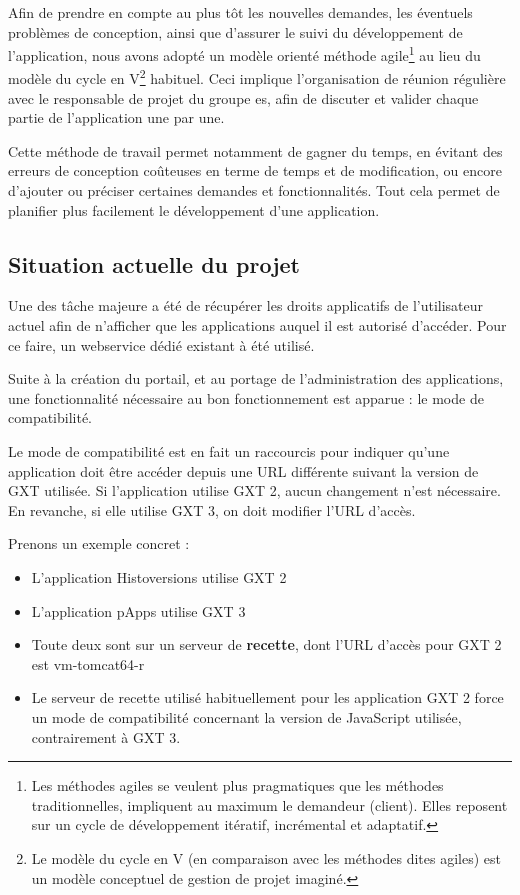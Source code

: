 \documentclass[12pt]{report}
\begin{document}
    Afin de prendre en compte au plus tôt les nouvelles demandes, les éventuels problèmes de conception, ainsi que d'assurer le suivi du développement de l'application, nous avons adopté un modèle orienté méthode agile\footnote{Les méthodes agiles se veulent plus pragmatiques que les méthodes traditionnelles, impliquent au maximum le demandeur (client). Elles reposent sur un cycle de développement itératif, incrémental et adaptatif\cite{wiki:agile}.} au lieu du modèle du cycle en V\footnote{Le modèle du cycle en V (en comparaison avec les méthodes dites agiles) est un modèle conceptuel de gestion de projet imaginé\cite{wiki:cycleV}.} habituel. Ceci implique l'organisation de réunion régulière avec le responsable de projet du groupe \acrshort{es}, afin de discuter et valider chaque partie de l'application une par une.
    
    Cette méthode de travail permet notamment de gagner du temps, en évitant des erreurs de conception coûteuses en terme de temps et de modification, ou encore d'ajouter ou préciser certaines demandes et fonctionnalités. Tout cela permet de planifier plus facilement le développement d'une application.
    
    \subsection{Situation actuelle du projet}
    
    Une des tâche majeure a été de récupérer les droits applicatifs de l'utilisateur actuel afin de n'afficher que les applications auquel il est autorisé d'accéder. Pour ce faire, un webservice dédié existant à été utilisé.
    
    Suite à la création du portail, et au portage de l'administration des applications, une fonctionnalité nécessaire au bon fonctionnement est apparue : le mode de compatibilité.
    
    Le mode de compatibilité est en fait un raccourcis pour indiquer qu'une application doit être accéder depuis une URL différente suivant la version de GXT utilisée. Si l'application utilise GXT 2, aucun changement n'est nécessaire. En revanche, si elle utilise GXT 3, on doit modifier l'URL d'accès.
    
    Prenons un exemple concret :
    \begin{itemize}[itemsep=1pt, topsep=1pt]
        \item L'application Histoversions utilise GXT 2
        \item L'application pApps utilise GXT 3
        \item Toute deux sont sur un serveur de \textbf{recette}, dont l'URL d'accès pour GXT 2 est vm-tomcat64-r
        \item Le serveur de recette utilisé habituellement pour les application GXT 2 force un mode de compatibilité concernant la version de JavaScript utilisée, contrairement à GXT 3.
    \end{itemize}
    
\end{document}
